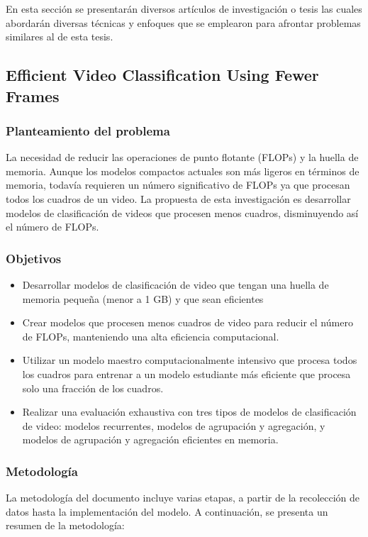 En esta sección se presentarán diversos artículos de investigación o tesis las cuales abordarán diversas técnicas y enfoques que se emplearon para afrontar problemas similares al de esta tesis.


\subsection{Efficient Video Classification Using Fewer Frames}
	\cite {bhardwaj2019efficient}
\subsubsection{Planteamiento del problema}
La necesidad de reducir las operaciones de punto flotante (FLOPs) y la huella de memoria. Aunque los modelos compactos actuales son más ligeros en términos de memoria, todavía requieren un número significativo de FLOPs ya que procesan todos los cuadros de un video. La propuesta de esta investigación es desarrollar modelos de clasificación de videos que procesen menos cuadros, disminuyendo así el número de FLOPs.
\subsubsection{Objetivos}

\begin{itemize}
	\item Desarrollar modelos de clasificación de video que tengan una huella de memoria pequeña (menor a 1 GB) y que sean eficientes 
	\item Crear modelos que procesen menos cuadros de video para reducir el número de FLOPs, manteniendo una alta eficiencia computacional.
	\item Utilizar un modelo maestro computacionalmente intensivo que procesa todos los cuadros para entrenar a un modelo estudiante más eficiente que procesa solo una fracción de los cuadros.
	\item Realizar una evaluación exhaustiva con tres tipos de modelos de clasificación de video: modelos recurrentes, modelos de agrupación y agregación, y modelos de agrupación y agregación eficientes en memoria.
\end{itemize}

\subsubsection{Metodología}
La metodología del documento incluye varias etapas, a partir de la recolección de datos hasta la implementación del modelo. A continuación, se presenta un resumen de la metodología:

